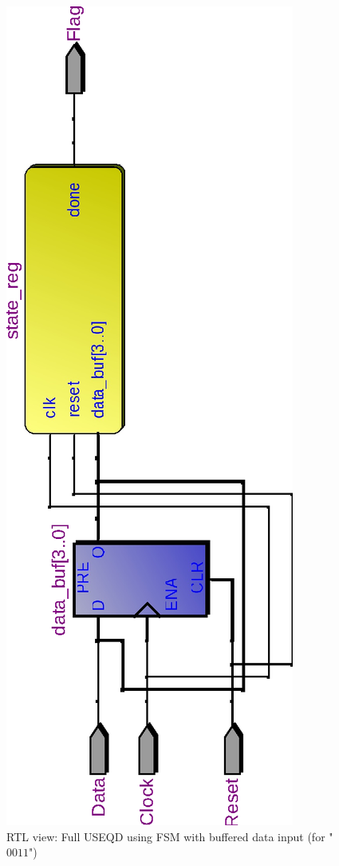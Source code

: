 \documentclass[10pt,a4paper]{report}
\begin{document}
\begin{figure}
\includegraphics[scale=0.6,angle=-90]{graphs/seq_test1.rtl_0011.eps}
\caption{\small{RTL view: Full USEQD using FSM with buffered data input (for "$0011$")}} \label{wave:usd:1}
\end{figure}
\end{document}
